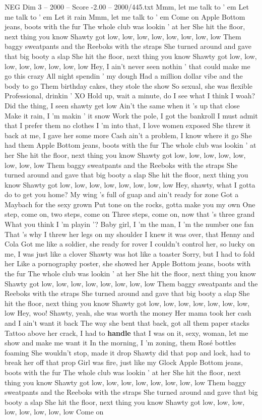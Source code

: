\begin{textsample}{NEG Dim 3 – 2000 – Score -2.00 – 2000/445.txt}  \label{ex:f3_neg_008}
Mmm, let me talk to ' em Let me talk to ' em Let it rain Mmm, let me talk to ' em Come on Apple Bottom jeans, boots with the fur The whole club was lookin ' at her She hit the floor, next thing you know Shawty got low, low, low, low, low, low, low, low Them baggy sweatpants and the Reeboks with the straps She turned around and gave that big booty a slap She hit the floor, next thing you know Shawty got low, low, low, low, low, low, low, low Hey, I ain't never seen nothin ' that could make me go this crazy All night spendin ' my dough Had a million dollar vibe and the body to go Them birthday cakes, they stole the show So sexual, she was flexible Professional, drinkin ' XO Hold up, wait a minute, do I see what I think I woah?
Did the thing, I seen shawty get low Ain't the same when it 's up that close Make it rain, I 'm makin ' it snow Work the pole, I got the bankroll I must admit that I prefer them no clothes I 'm into that, I love women exposed She threw it back at me, I gave her some more Cash ain't a problem, I know where it go She had them Apple Bottom jeans, boots with the fur The whole club was lookin ' at her She hit the floor, next thing you know Shawty got low, low, low, low, low, low, low, low Them baggy sweatpants and the Reeboks with the straps She turned around and gave that big booty a slap She hit the floor, next thing you know Shawty got low, low, low, low, low, low, low, low Hey, shawty, what I gotta do to get you home?
My wing 's full of guap and ain't ready for zone Got a Maybach for the sexy grown Put tone on the rocks, gotta make you my own One step, come on, two steps, come on Three steps, come on, now that 's three grand What you think I 'm playin '?
Baby girl, I 'm the man, I 'm the number one fan That 's why I threw her legs on my shoulder I knew it was over, that Henny and Cola Got me like a soldier, she ready for rover I couldn't control her, so lucky on me, I was just like a clover Shawty was hot like a toaster Sorry, but I had to fold her Like a pornography poster, she showed her Apple Bottom jeans, boots with the fur The whole club was lookin ' at her She hit the floor, next thing you know Shawty got low, low, low, low, low, low, low, low Them baggy sweatpants and the Reeboks with the straps She turned around and gave that big booty a slap She hit the floor, next thing you know Shawty got low, low, low, low, low, low, low, low Hey, woo!
Shawty, yeah, she was worth the money Her mama took her cash and I ain't want it back The way she bent that back, got all them paper stacks Tattoo above her crack, I had to \textbf{handle} that I was on it, sexy, woman, let me show and make me want it In the morning, I 'm zoning, them Rosé bottles foaming She wouldn't stop, made it drop Shawty did that pop and lock, had to break her off that prop Girl was fire, just like my Glock Apple Bottom jeans, boots with the fur The whole club was lookin ' at her She hit the floor, next thing you know Shawty got low, low, low, low, low, low, low, low Them baggy sweatpants and the Reeboks with the straps She turned around and gave that big booty a slap She hit the floor, next thing you know Shawty got low, low, low, low, low, low, low, low Come on

\end{textsample}
